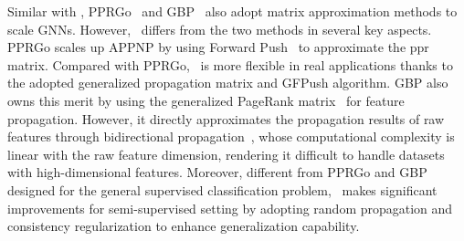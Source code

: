 Similar with \model,  PPRGo~\cite{bojchevski2020scaling} and GBP~\cite{chen2020scalable} also adopt matrix approximation methods to scale GNNs. However, \model\ differs from the two methods in several key aspects. PPRGo scales up APPNP by using Forward Push~\cite{andersen2006local} to approximate the ppr matrix. Compared with PPRGo, \model\ is more flexible in real applications thanks to the adopted generalized propagation matrix  and GFPush algorithm. GBP also owns this merit by using the generalized PageRank matrix~\cite{li2019optimizing} for feature propagation. However, it directly approximates the propagation results of raw features through bidirectional propagation~\cite{banerjee2015fast}, whose computational complexity is linear with the raw feature dimension, rendering it difficult to handle datasets with high-dimensional features.
Moreover, different from PPRGo and GBP designed for the general supervised classification problem,  \model\ makes significant improvements for semi-supervised setting by adopting random propagation and consistency regularization to enhance generalization capability.


 
 
 
 
 
 




